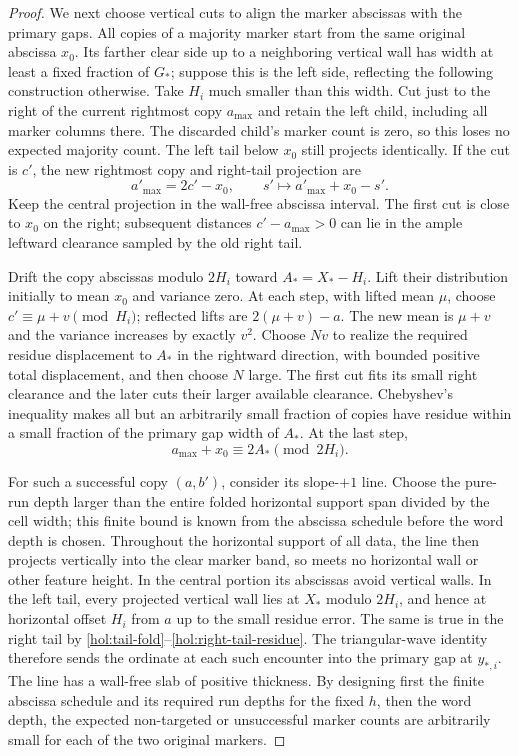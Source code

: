 \begin{proof}
We next choose vertical cuts to align the marker abscissas with the
primary gaps.  All copies of a majority marker start from the same
original abscissa $x_0$.  Its farther clear side up to a neighboring
vertical wall has width at least a fixed fraction of $G_*$; suppose
this is the left side, reflecting the following construction otherwise.
Take $H_i$ much smaller than this width.  Cut just to the right of
the current rightmost copy $a_{\max}$ and retain the left child,
including all marker columns there.  The discarded child's marker
count is zero, so this loses no expected majority count.  The left
tail below $x_0$ still projects identically.  If the cut is $c'$, the
new rightmost copy and right-tail projection are
\begin{equation}
 a'_{\max}=2c'-x_0,\qquad
 s'\longmapsto a'_{\max}+x_0-s'.
 \label{hol:tail-fold}
\end{equation}
Keep the central projection in the wall-free abscissa interval.
The first cut is close to $x_0$ on the right; subsequent distances
$c'-a_{\max}>0$ can lie in the ample leftward clearance sampled
by the old right tail.

Drift the copy abscissas modulo $2H_i$ toward
$A_*=X_*-H_i$.  Lift their distribution initially to mean $x_0$
and variance zero.  At each step, with lifted mean $\mu$, choose
$c'\equiv\mu+v\pmod{H_i}$; reflected lifts are
$2(\mu+v)-a$.  The new mean is $\mu+v$ and the variance increases
by exactly $v^2$.  Choose $Nv$ to realize the required residue
displacement to $A_*$ in the rightward direction, with bounded positive
total displacement, and then choose $N$ large.  The first cut fits
its small right clearance and the later cuts their larger available
clearance.  Chebyshev's inequality makes all but an arbitrarily small
fraction of copies have residue within a small fraction of the primary
gap width of $A_*$.  At the last step,
\begin{equation}
 a_{\max}+x_0\equiv2A_*\pmod{2H_i}.
 \label{hol:right-tail-residue}
\end{equation}

For such a successful copy $(a,b')$, consider its slope-$+1$ line.
Choose the pure-run depth larger than the entire folded horizontal
support span divided by the cell width; this finite bound is known
from the abscissa schedule before the word depth is chosen.  Throughout
the horizontal support of all data, the line then projects vertically
into the clear marker band, so meets no horizontal wall or other
feature height.  In the central portion its abscissas avoid vertical
walls.  In the left tail, every projected vertical wall lies at
$X_*$ modulo $2H_i$, and hence at horizontal offset $H_i$ from $a$
up to the small residue error.  The same is true in the right tail by
\eqref{hol:tail-fold}--\eqref{hol:right-tail-residue}.
The triangular-wave identity therefore sends the ordinate at each
such encounter into the primary gap at $y_{*,i}$.  The line has a
wall-free slab of positive thickness.  By designing first the finite
abscissa schedule and its required run depths for the fixed $h$, then
the word depth, the expected non-targeted or unsuccessful marker
counts are arbitrarily small for each of the two original markers.


\end{proof}
